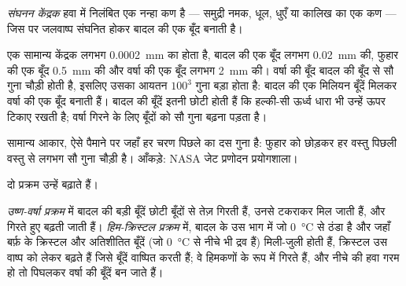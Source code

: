 \begin{definition}[संघनन केंद्रक]\label{def:g10:why-clouds-form:nucleus}
\emph{संघनन केंद्रक} हवा में निलंबित एक नन्हा कण है --- समुद्री
नमक, धूल, धुएँ या कालिख का एक कण --- जिस पर जलवाष्प संघनित होकर बादल की एक बूँद
बनाती है।
\end{definition}

एक सामान्य केंद्रक लगभग \qty{0.0002}{mm} का होता है, बादल की एक बूँद लगभग
\qty{0.02}{mm} की, फुहार की एक बूँद \qty{0.5}{mm} की और वर्षा की एक बूँद लगभग
\qty{2}{mm} की। वर्षा की बूँद बादल की बूँद से सौ गुना चौड़ी होती है, इसलिए उसका
आयतन $100^3$ गुना बड़ा होता है: बादल की एक मिलियन बूँदें मिलकर वर्षा की एक बूँद बनाती हैं।
बादल की बूँदें इतनी छोटी होती हैं कि हल्की-सी ऊर्ध्व धारा भी उन्हें
ऊपर टिकाए रखती है; वर्षा गिरने के लिए बूँदों को सौ गुना बढ़ना पड़ता है।

\begin{omfigure}

{\small सामान्य आकार, ऐसे पैमाने पर जहाँ हर चरण पिछले का दस गुना है: फुहार को छोड़कर
हर वस्तु पिछली वस्तु से लगभग सौ गुना चौड़ी है। आँकड़े: NASA जेट प्रणोदन
प्रयोगशाला।}
\end{omfigure}

दो प्रक्रम उन्हें बढ़ाते हैं।

\begin{definition}[उष्ण-वर्षा प्रक्रम; हिम-क्रिस्टल प्रक्रम]\label{def:g10:why-clouds-form:rain-processes}
\emph{उष्ण-वर्षा प्रक्रम} में बादल की बड़ी
बूँदें छोटी बूँदों से तेज़ गिरती हैं, उनसे टकराकर
मिल जाती हैं, और गिरते हुए बढ़ती जाती हैं। \emph{हिम-क्रिस्टल
प्रक्रम} में, बादल के उस भाग में जो
\qty{0}{\degreeCelsius} से ठंडा है और जहाँ बर्फ़ के क्रिस्टल और अतिशीतित बूँदें (जो
\qty{0}{\degreeCelsius} से नीचे भी द्रव हैं) मिली-जुली होती हैं, क्रिस्टल उस
वाष्प को लेकर बढ़ते हैं जिसे बूँदें वाष्पित करती हैं; वे हिमकणों के रूप में गिरते हैं, और नीचे की
हवा गरम हो तो पिघलकर वर्षा की बूँदें बन जाते हैं।
\end{definition}

